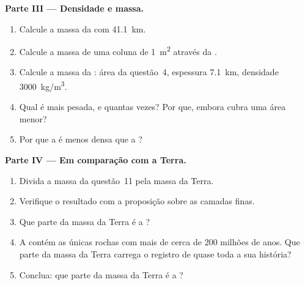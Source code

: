 \begin{problem}
\medskip
\noindent\textbf{Parte III --- Densidade e massa.}
\begin{enumerate}[resume]
  \item Calcule a massa da  com \qty{41.1}{km}.
  \item Calcule a massa de uma coluna de \qty{1}{m^2} através da .
  \item Calcule a massa da : área da questão~4, espessura
        \qty{7.1}{km}, densidade \qty{3000}{kg/m^3}.
  \item Qual é mais pesada, e quantas vezes? Por que, embora cubra uma área
        menor?
  \item Por que a  é menos densa que a ?
\end{enumerate}

\medskip
\noindent\textbf{Parte IV --- Em comparação com a Terra.}
\begin{enumerate}[resume]
  \item Divida a massa da questão~11 pela massa da Terra.
  \item Verifique o resultado com a proposição sobre as camadas finas.
  \item Que parte da massa da Terra é a ?
  \item A  contém as únicas rochas com mais de cerca de
        200 milhões de anos. Que parte da massa da Terra carrega o registro
        de quase toda a sua história?
  \item Conclua: que parte da massa da Terra é a ?
\end{enumerate}
\end{problem}

